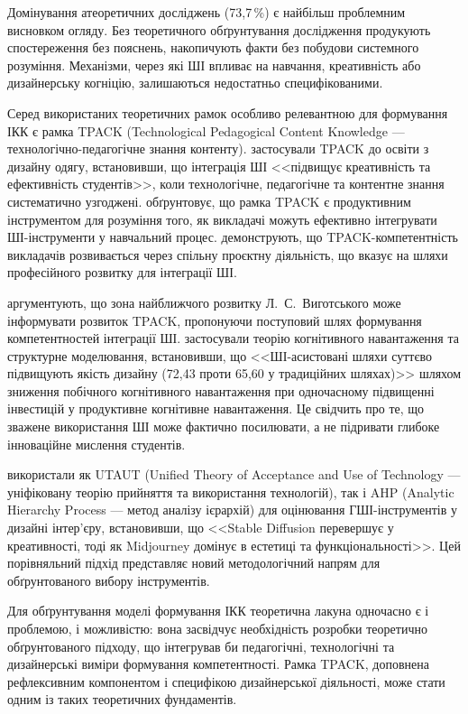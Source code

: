 Домінування атеоретичних досліджень (73,7\,\%) є найбільш проблемним висновком огляду. Без теоретичного обґрунтування дослідження продукують спостереження без пояснень, накопичують факти без побудови системного розуміння. Механізми, через які ШІ впливає на навчання, креативність або дизайнерську когніцію, залишаються недостатньо специфікованими.

Серед використаних теоретичних рамок особливо релевантною для формування ІКК є рамка TPACK (Technological Pedagogical Content Knowledge --- технологічно-педагогічне знання контенту). \citet{Lee2024} застосували TPACK до освіти з дизайну одягу, встановивши, що інтеграція ШІ <<підвищує креативність та ефективність студентів>>, коли технологічне, педагогічне та контентне знання систематично узгоджені. \citet{Bower2017} обґрунтовує, що рамка TPACK є продуктивним інструментом для розуміння того, як викладачі можуть ефективно інтегрувати ШІ-інструменти у навчальний процес. \citet{Boschman2015} демонструють, що TPACK-компетентність викладачів розвивається через спільну проєктну діяльність, що вказує на шляхи професійного розвитку для інтеграції ШІ.

\citet{Polly2020} аргументують, що зона найближчого розвитку Л.~С.~Виготського може інформувати розвиток TPACK, пропонуючи поступовий шлях формування компетентностей інтеграції ШІ. \citet{Dong2025} застосували теорію когнітивного навантаження та структурне моделювання, встановивши, що <<ШІ-асистовані шляхи суттєво підвищують якість дизайну (72,43 проти 65,60 у традиційних шляхах)>> шляхом зниження побічного когнітивного навантаження при одночасному підвищенні інвестицій у продуктивне когнітивне навантаження. Це свідчить про те, що зважене використання ШІ може фактично посилювати, а не підривати глибоке інноваційне мислення студентів.

\citet{Liu2025} використали як UTAUT (Unified Theory of Acceptance and Use of Technology --- уніфіковану теорію прийняття та використання технологій), так і AHP (Analytic Hierarchy Process --- метод аналізу ієрархій) для оцінювання ГШІ-інструментів у дизайні інтер'єру, встановивши, що <<Stable Diffusion перевершує у креативності, тоді як Midjourney домінує в естетиці та функціональності>>. Цей порівняльний підхід представляє новий методологічний напрям для обґрунтованого вибору інструментів.

Для обґрунтування моделі формування ІКК теоретична лакуна одночасно є і проблемою, і можливістю: вона засвідчує необхідність розробки теоретично обґрунтованого підходу, що інтегрував би педагогічні, технологічні та дизайнерські виміри формування компетентності. Рамка TPACK, доповнена рефлексивним компонентом і специфікою дизайнерської діяльності, може стати одним із таких теоретичних фундаментів.

